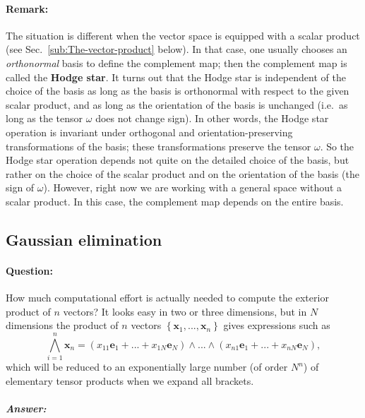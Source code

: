 \paragraph{Remark:}

The situation is different when the vector space is equipped with
a scalar product (see Sec.~\ref{sub:The-vector-product} below).
In that case, one usually chooses an \emph{orthonormal} basis to define
the complement map; then the complement map is called the \textbf{Hodge
star}. It turns out that the Hodge star is independent of the choice
of the basis as long as the basis is orthonormal with respect to the
given scalar product, and as long as the orientation of the basis
is unchanged (i.e.~as long as the tensor $\omega$ does not change
sign). In other words, the Hodge star operation is invariant under
orthogonal and orientation-preserving transformations of the basis;
these transformations preserve the tensor $\omega$. So the Hodge
star operation depends not quite on the detailed choice of the basis,
but rather on the choice of the scalar product and on the orientation
of the basis (the sign of $\omega$). However, right now we are working
with a general space without a scalar product. In this case, the complement
map depends on the entire basis.


\subsection{Gaussian elimination}


\paragraph{Question:}

How much computational effort is actually needed to compute the exterior
product of $n$ vectors? It looks easy in two or three dimensions,
but in $N$ dimensions the product of $n$ vectors $\left\{ \mathbf{x}_{1},...,\mathbf{x}_{n}\right\} $
gives expressions such as\[
\bigwedge_{i=1}^{n}\mathbf{x}_{n}=\left(x_{11}\mathbf{e}_{1}+...+x_{1N}\mathbf{e}_{N}\right)\wedge...\wedge\left(x_{n1}\mathbf{e}_{1}+...+x_{nN}\mathbf{e}_{N}\right),\]
which will be reduced to an exponentially large number (of order $N^{n}$)
of elementary tensor products when we expand all brackets.


\subparagraph{Answer:}

